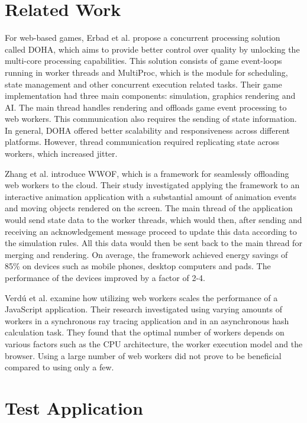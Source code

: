 \documentclass[conference, 9pt]{IEEEtran}
\begin{document}
\section{Related Work}
\label{sec:soa}

For web-based games, Erbad et al. \cite{doha} propose a concurrent processing solution called DOHA, which aims to provide better control over quality by unlocking the 
multi-core processing capabilities. This solution consists of game event-loops running in worker threads and MultiProc, which is the module for scheduling, state 
management and other concurrent execution related tasks. Their game implementation had three main components: simulation, graphics rendering and AI. The main thread 
handles rendering and offloads game event processing to web workers. This communication also requires the sending of state information. In general, DOHA offered better 
scalability and responsiveness across different platforms. However, thread communication required replicating state across workers, which increased jitter.

Zhang et al. \cite{zhang} introduce WWOF, which is a framework for seamlessly offloading web workers to the cloud. Their study investigated applying the framework to an 
interactive animation application with a substantial amount of animation events and moving objects rendered on the screen. The main thread of the application would send 
state data to the worker threads, which would then, after sending and receiving an acknowledgement message proceed to update this data according to the simulation rules. 
All this data would then be sent back to the main thread for merging and rendering. On average, the framework achieved energy savings of 85\% on devices such as mobile 
phones, desktop computers and pads. The performance of the devices improved by a factor of 2-4.

Verdú et al. \cite{verdu} examine how utilizing web workers scales the performance of a JavaScript application. Their research investigated using varying amounts of 
workers in a synchronous ray tracing application and in an asynchronous hash calculation task. They found that the optimal number of workers depends on various factors 
such as the CPU architecture, the worker execution model and the browser. Using a large number of web workers did not prove to be beneficial compared to using only a few.

\section{Test Application}
\label{sec:implementation}
\end{document}
